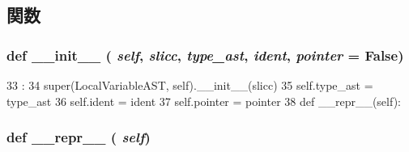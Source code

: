 \subsection{関数}
\hypertarget{classslicc_1_1ast_1_1LocalVariableAST_1_1LocalVariableAST_ac775ee34451fdfa742b318538164070e}{
\subsubsection[{\_\-\_\-init\_\-\_\-}]{\setlength{\rightskip}{0pt plus 5cm}def \_\-\_\-init\_\-\_\- ( {\em self}, \/   {\em slicc}, \/   {\em type\_\-ast}, \/   {\em ident}, \/   {\em pointer} = {\ttfamily False})}}
\label{classslicc_1_1ast_1_1LocalVariableAST_1_1LocalVariableAST_ac775ee34451fdfa742b318538164070e}



\begin{DoxyCode}
33                                                                :
34         super(LocalVariableAST, self).__init__(slicc)
35         self.type_ast = type_ast
36         self.ident    = ident
37         self.pointer = pointer
38 
    def __repr__(self):
\end{DoxyCode}
\hypertarget{classslicc_1_1ast_1_1LocalVariableAST_1_1LocalVariableAST_ad8b9328939df072e4740cd9a63189744}{
\subsubsection[{\_\-\_\-repr\_\-\_\-}]{\setlength{\rightskip}{0pt plus 5cm}def \_\-\_\-repr\_\-\_\- ( {\em self})}}
\label{classslicc_1_1ast_1_1LocalVariableAST_1_1LocalVariableAST_ad8b9328939df072e4740cd9a63189744}



